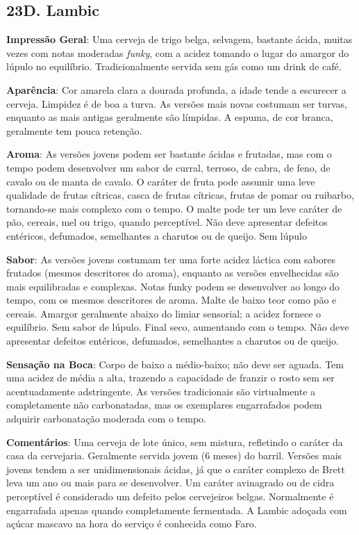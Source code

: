 \subsection*{23D. Lambic}

\textbf{Impressão Geral}: Uma cerveja de trigo belga, selvagem, bastante ácida, muitas vezes com notas moderadas \textit{funky}, com a acidez tomando o lugar do amargor do lúpulo no equilíbrio. Tradicionalmente servida sem gás como um drink de café.

\textbf{Aparência}: Cor amarela clara a dourada profunda, a idade tende a escurecer a cerveja. Limpidez é de boa a turva. As versões mais novas costumam ser turvas, enquanto as mais antigas geralmente são límpidas. A espuma, de cor branca, geralmente tem pouca retenção.

\textbf{Aroma}: As versões jovens podem ser bastante ácidas e frutadas, mas com o tempo podem desenvolver um sabor de curral, terroso, de cabra, de feno, de cavalo ou de manta de cavalo. O caráter de fruta pode assumir uma leve qualidade de frutas cítricas, casca de frutas cítricas, frutas de pomar ou ruibarbo, tornando-se mais complexo com o tempo. O malte pode ter um leve caráter de pão, cereais, mel ou trigo, quando perceptível. Não deve apresentar defeitos entéricos, defumados, semelhantes a charutos ou de queijo. Sem lúpulo

\textbf{Sabor}: As versões jovens costumam ter uma forte acidez láctica com sabores frutados (mesmos descritores do aroma), enquanto as versões envelhecidas são mais equilibradas e complexas. Notas funky podem se desenvolver ao longo do tempo, com os mesmos descritores de aroma. Malte de baixo teor como pão e cereais. Amargor geralmente abaixo do limiar sensorial; a acidez fornece o equilíbrio. Sem sabor de lúpulo. Final seco, aumentando com o tempo. Não deve apresentar defeitos entéricos, defumados, semelhantes a charutos ou de queijo.

\textbf{Sensação na Boca}: Corpo de baixo a médio-baixo; não deve ser aguada. Tem uma acidez de média a alta, trazendo a capacidade de franzir o rosto sem ser acentuadamente adstringente. As versões tradicionais são virtualmente a completamente não carbonatadas, mas os exemplares engarrafados podem adquirir carbonatação moderada com o tempo.

\textbf{Comentários}: Uma cerveja de lote único, sem mistura, refletindo o caráter da casa da cervejaria. Geralmente servida jovem (6 meses) do barril. Versões mais jovens tendem a ser unidimensionais ácidas, já que o caráter complexo de Brett leva um ano ou mais para se desenvolver. Um caráter avinagrado ou de cidra perceptível é considerado um defeito pelos cervejeiros belgas. Normalmente é engarrafada apenas quando completamente fermentada. A Lambic adoçada com açúcar mascavo na hora do serviço é conhecida como Faro.

